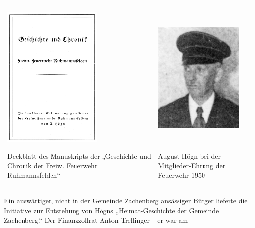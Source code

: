 \begin{center}
\begin{minipage}{10.007cm}
\begin{flushleft}
\tablefirsthead{}
\tablehead{}
\tabletail{}
\tablelasttail{}
\begin{supertabular}{m{5.0280004cm}m{4.578cm}}

\includegraphics[width=4.847cm,height=6.997cm]{pictures/zulassungsarbeit-img041.png}

Deckblatt des Manuskripts der
„Geschichte und Chronik der Freiw. Feuerwehr Ruhmannsfelden“ &

\includegraphics[width=4.396cm,height=6.997cm]{pictures/zulassungsarbeit-img042.jpg}

August Högn bei der Mitglieder-Ehrung
der Feuerwehr 1950\\
\end{supertabular}
\end{flushleft}
\end{minipage}
\end{center}
Ein auswärtiger, nicht in der Gemeinde Zachenberg ansässiger Bürger
lieferte die Initiative zur Entstehung von Högns „Heimat-Geschichte der
Gemeinde Zachenberg.“ Der Finanzzollrat Anton Trellinger – er war am
